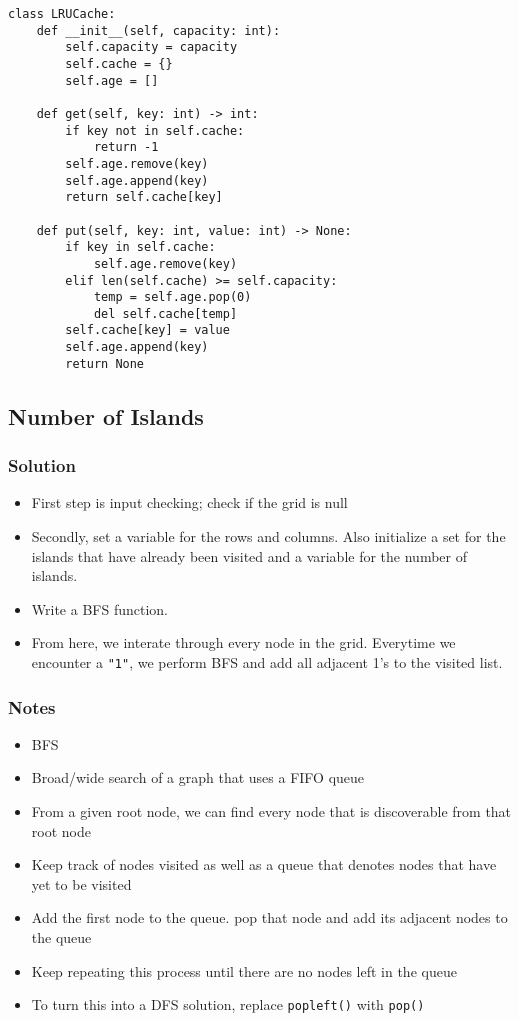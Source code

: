 \documentclass{article}
\begin{document}
\begin{lstlisting}
class LRUCache:
    def __init__(self, capacity: int):
        self.capacity = capacity
        self.cache = {}   
        self.age = []    

    def get(self, key: int) -> int:
        if key not in self.cache:
            return -1
        self.age.remove(key)
        self.age.append(key)
        return self.cache[key]

    def put(self, key: int, value: int) -> None:
        if key in self.cache:
            self.age.remove(key)
        elif len(self.cache) >= self.capacity:  
            temp = self.age.pop(0)
            del self.cache[temp]
        self.cache[key] = value
        self.age.append(key)
        return None
\end{lstlisting}

\subsection{Number of Islands}
\subsubsection{Solution}
\begin{itemize}
\item First step is input checking; check if the grid is null
\item Secondly, set a variable for the rows and columns. Also initialize a set for the islands that have already been visited and a variable for the number of islands.
\item Write a BFS function.
\item From here, we interate through every node in the grid. Everytime we encounter a \lstinline{"1"}, we perform BFS and add all adjacent 1's to the visited list.
\end{itemize}

\subsubsection{Notes}
\begin{itemize}
\item BFS
\item Broad/wide search of a graph that uses a FIFO queue
\item From a given root node, we can find every node that is discoverable from that root node
\item Keep track of nodes visited as well as a queue that denotes nodes that have yet to be visited
\item Add the first node to the queue. pop that node and add its adjacent nodes to the queue
\item Keep repeating this process until there are no nodes left in the queue
\item To turn this into a DFS solution, replace \lstinline{popleft()} with \lstinline{pop()}
\end{itemize}
  
\end{document}
